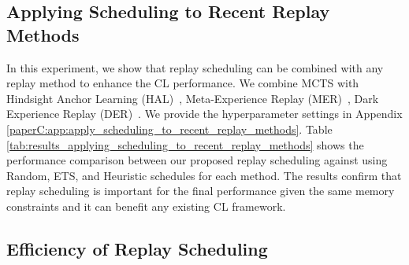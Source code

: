 %
\subsection{Applying Scheduling to Recent Replay Methods}\label{paperC:sec:applying_scheduling_to_recent_replay_methods}

In this experiment, we show that replay scheduling can be combined with any replay method to enhance the CL performance. We combine MCTS with Hindsight Anchor Learning (HAL)~, Meta-Experience Replay (MER)~, Dark Experience Replay (DER)~. %
We provide the hyperparameter settings in Appendix \ref{paperC:app:apply_scheduling_to_recent_replay_methods}. Table \ref{tab:results_applying_scheduling_to_recent_replay_methods} shows the performance comparison between our proposed replay scheduling against using Random, ETS, and Heuristic schedules for each method. The results confirm that replay scheduling %
is important for the final performance given the same memory constraints and it can benefit any existing CL framework. 


%
\subsection{Efficiency of Replay Scheduling}
\label{paperC:sec:efficiency_of_replay_scheduling}

